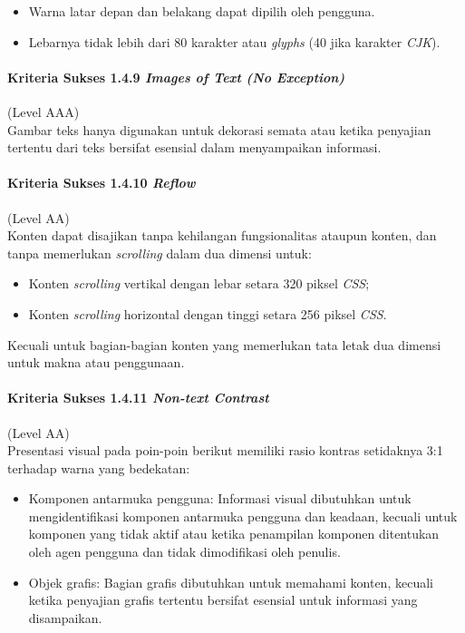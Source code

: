 \begin{itemize}
	\item Warna latar depan dan belakang dapat dipilih oleh pengguna.
	\item Lebarnya tidak lebih dari 80 karakter atau \textit{glyphs} (40 jika karakter \textit{CJK}).
\end{itemize}

\paragraph{Kriteria Sukses 1.4.9 \textit{Images of Text (No Exception)}}
\label{sec:kriteria_sukses_1.4.9}
(Level AAA)\\

Gambar teks hanya digunakan untuk dekorasi semata atau ketika penyajian tertentu dari teks bersifat esensial dalam menyampaikan informasi.

\paragraph{Kriteria Sukses 1.4.10 \textit{Reflow}}
\label{sec:kriteria_sukses_1.4.10}
(Level AA)\\

Konten dapat disajikan tanpa kehilangan fungsionalitas ataupun konten, dan tanpa memerlukan \textit{scrolling} dalam dua dimensi untuk:

\begin{itemize}
	\item Konten \textit{scrolling} vertikal dengan lebar setara 320 piksel \textit{CSS};
	\item Konten \textit{scrolling} horizontal dengan tinggi setara 256 piksel \textit{CSS}.
\end{itemize}

Kecuali untuk bagian-bagian konten yang memerlukan tata letak dua dimensi untuk makna atau penggunaan.

\paragraph{Kriteria Sukses 1.4.11 \textit{Non-text Contrast}}
\label{sec:kriteria_sukses_1.4.11}
(Level AA)\\

Presentasi visual pada poin-poin berikut memiliki rasio kontras setidaknya 3:1 terhadap warna yang bedekatan:

\begin{itemize}
	\item Komponen antarmuka pengguna: Informasi visual dibutuhkan untuk mengidentifikasi komponen antarmuka pengguna dan keadaan, kecuali untuk komponen yang tidak aktif atau ketika penampilan komponen ditentukan oleh agen pengguna dan tidak dimodifikasi oleh penulis.
	\item Objek grafis: Bagian grafis dibutuhkan untuk memahami konten, kecuali ketika penyajian grafis tertentu bersifat esensial untuk informasi yang disampaikan.
\end{itemize}

